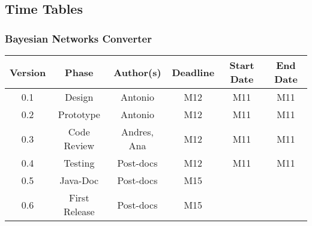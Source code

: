 \newpage
\subsection{Time Tables}

\subsubsection*{Bayesian Networks Converter}

\begin{table}[H]
\begin{tabular}{cccccc}
\hline
\textbf{Version} & \textbf{Phase} & \textbf{Author(s)} & \textbf{Deadline} & \textbf{Start Date} & \textbf{End Date}\\
\hline
0.1 & Design & Antonio & M12 & M11 & M11\\
\hline 
0.2 & Prototype & Antonio & M12 & M11 & M11 \\
\hline 
0.3 & Code Review & Andres, Ana &  M12 &  M11 & M11\\
\hline 
0.4 & Testing & Post-docs &  M12 &  M11 & M11\\
\hline 
0.5 & Java-Doc  & Post-docs &  M15 & & \\
\hline 
0.6 & First Release & Post-docs &  M15 & & \\
\hline
\end{tabular}
\end{table}


